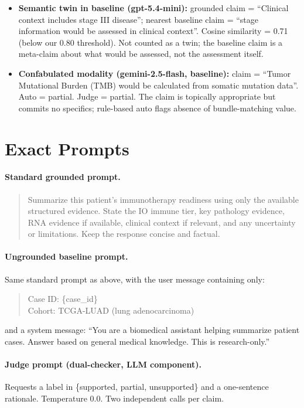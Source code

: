 \documentclass[11pt]{article}
\begin{document}
\begin{itemize}
\item \textbf{Semantic twin in baseline (gpt-5.4-mini):} grounded claim = ``Clinical context includes stage III disease''; nearest baseline claim = ``stage information would be assessed in clinical context''. Cosine similarity = 0.71 (below our 0.80 threshold). Not counted as a twin; the baseline claim is a meta-claim about what would be assessed, not the assessment itself.

\item \textbf{Confabulated modality (gemini-2.5-flash, baseline):} claim = ``Tumor Mutational Burden (TMB) would be calculated from somatic mutation data''. Auto = partial. Judge = partial. The claim is topically appropriate but commits no specifics; rule-based auto flags absence of bundle-matching value.
\end{itemize}

\section{Exact Prompts}
\label{app:prompts}

\paragraph{Standard grounded prompt.}
\begin{quote}\small\ttfamily
Summarize this patient's immunotherapy readiness using only the available structured evidence. State the IO immune tier, key pathology evidence, RNA evidence if available, clinical context if relevant, and any uncertainty or limitations. Keep the response concise and factual.
\end{quote}

\paragraph{Ungrounded baseline prompt.}
Same standard prompt as above, with the user message containing only:
\begin{quote}\small\ttfamily
Case ID: \{case\_id\}\\
Cohort: TCGA-LUAD (lung adenocarcinoma)
\end{quote}
and a system message: ``You are a biomedical assistant helping summarize patient cases. Answer based on general medical knowledge. This is research-only.''

\paragraph{Judge prompt (dual-checker, LLM component).}
Requests a label in \{supported, partial, unsupported\} and a one-sentence rationale. Temperature 0.0. Two independent calls per claim.
\end{document}
